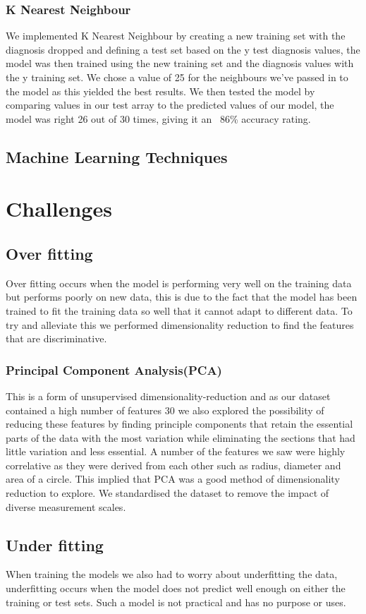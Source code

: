 \documentclass[conference]{IEEEtran}
\begin{document}
\subsubsection{K Nearest Neighbour}
We implemented K Nearest Neighbour by creating a new training set with the diagnosis dropped and defining a test set based on the y test diagnosis values, the model was then trained using the new training set and the diagnosis values with the y training set.  We chose a value of 25 for the neighbours we've passed in to the model as this yielded the best results.  We then tested the model by comparing values in our test array to the predicted values of our model, the model was right 26 out of 30 times, giving it an ~86\% accuracy rating.
\subsection{Machine Learning Techniques}
\section{Challenges}
\subsection{Over fitting}
Over fitting occurs when the model is performing very well on the training data but performs poorly on new data, this is due to the fact that the model has been trained to fit the training data so well that it cannot adapt to different data. To try and alleviate this we performed dimensionality reduction to find the features that are discriminative.
\subsubsection{Principal Component Analysis(PCA)} This is a form of unsupervised dimensionality-reduction and as our dataset contained a high number of features 30 we also explored the possibility of reducing these features by finding principle components that retain the essential parts of the data with the most variation while eliminating the sections that had little variation and less essential. A number of the features we saw were highly correlative as they were  derived from each other such as radius, diameter and area of a circle. This implied that PCA was a good method of dimensionality reduction to explore. We standardised the dataset to remove the impact of diverse measurement scales.
\subsection{Under fitting}
When training the models we also had to worry about underfitting the data, underfitting occurs when the model does not predict well enough on either the training or test sets.  Such a model is not practical and has no purpose or uses.
\end{document}
